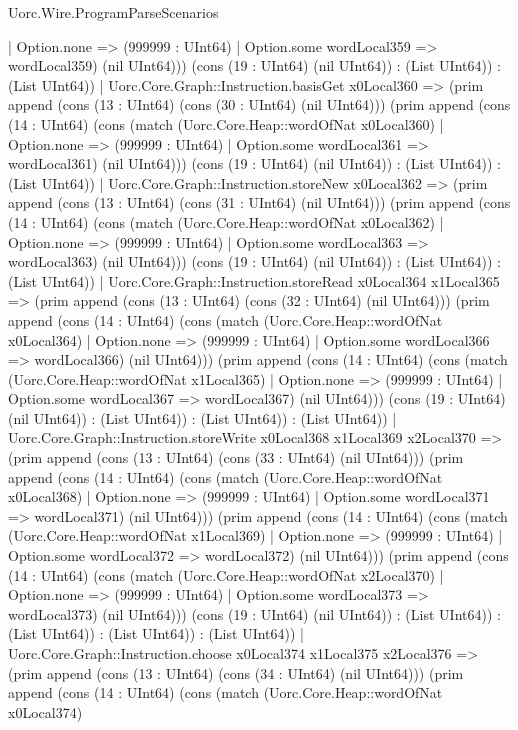 \begin{lexlean}{Uorc.Wire.ProgramParseScenarios}
\begin{semanticmodule}
{      | Option.none => (999999 : UInt64)
      | Option.some wordLocal359 => wordLocal359) (nil UInt64))) (cons (19 : UInt64) (nil UInt64)) : (List UInt64)) : (List UInt64))
    | Uorc.Core.Graph::Instruction.basisGet x0Local360 => (prim append (cons (13 : UInt64) (cons (30 : UInt64) (nil UInt64))) (prim append (cons (14 : UInt64) (cons (match (Uorc.Core.Heap::wordOfNat x0Local360)
      | Option.none => (999999 : UInt64)
      | Option.some wordLocal361 => wordLocal361) (nil UInt64))) (cons (19 : UInt64) (nil UInt64)) : (List UInt64)) : (List UInt64))
    | Uorc.Core.Graph::Instruction.storeNew x0Local362 => (prim append (cons (13 : UInt64) (cons (31 : UInt64) (nil UInt64))) (prim append (cons (14 : UInt64) (cons (match (Uorc.Core.Heap::wordOfNat x0Local362)
      | Option.none => (999999 : UInt64)
      | Option.some wordLocal363 => wordLocal363) (nil UInt64))) (cons (19 : UInt64) (nil UInt64)) : (List UInt64)) : (List UInt64))
    | Uorc.Core.Graph::Instruction.storeRead x0Local364 x1Local365 => (prim append (cons (13 : UInt64) (cons (32 : UInt64) (nil UInt64))) (prim append (cons (14 : UInt64) (cons (match (Uorc.Core.Heap::wordOfNat x0Local364)
      | Option.none => (999999 : UInt64)
      | Option.some wordLocal366 => wordLocal366) (nil UInt64))) (prim append (cons (14 : UInt64) (cons (match (Uorc.Core.Heap::wordOfNat x1Local365)
      | Option.none => (999999 : UInt64)
      | Option.some wordLocal367 => wordLocal367) (nil UInt64))) (cons (19 : UInt64) (nil UInt64)) : (List UInt64)) : (List UInt64)) : (List UInt64))
    | Uorc.Core.Graph::Instruction.storeWrite x0Local368 x1Local369 x2Local370 => (prim append (cons (13 : UInt64) (cons (33 : UInt64) (nil UInt64))) (prim append (cons (14 : UInt64) (cons (match (Uorc.Core.Heap::wordOfNat x0Local368)
      | Option.none => (999999 : UInt64)
      | Option.some wordLocal371 => wordLocal371) (nil UInt64))) (prim append (cons (14 : UInt64) (cons (match (Uorc.Core.Heap::wordOfNat x1Local369)
      | Option.none => (999999 : UInt64)
      | Option.some wordLocal372 => wordLocal372) (nil UInt64))) (prim append (cons (14 : UInt64) (cons (match (Uorc.Core.Heap::wordOfNat x2Local370)
      | Option.none => (999999 : UInt64)
      | Option.some wordLocal373 => wordLocal373) (nil UInt64))) (cons (19 : UInt64) (nil UInt64)) : (List UInt64)) : (List UInt64)) : (List UInt64)) : (List UInt64))
    | Uorc.Core.Graph::Instruction.choose x0Local374 x1Local375 x2Local376 => (prim append (cons (13 : UInt64) (cons (34 : UInt64) (nil UInt64))) (prim append (cons (14 : UInt64) (cons (match (Uorc.Core.Heap::wordOfNat x0Local374)
}
\end{semanticmodule}
\end{lexlean}
